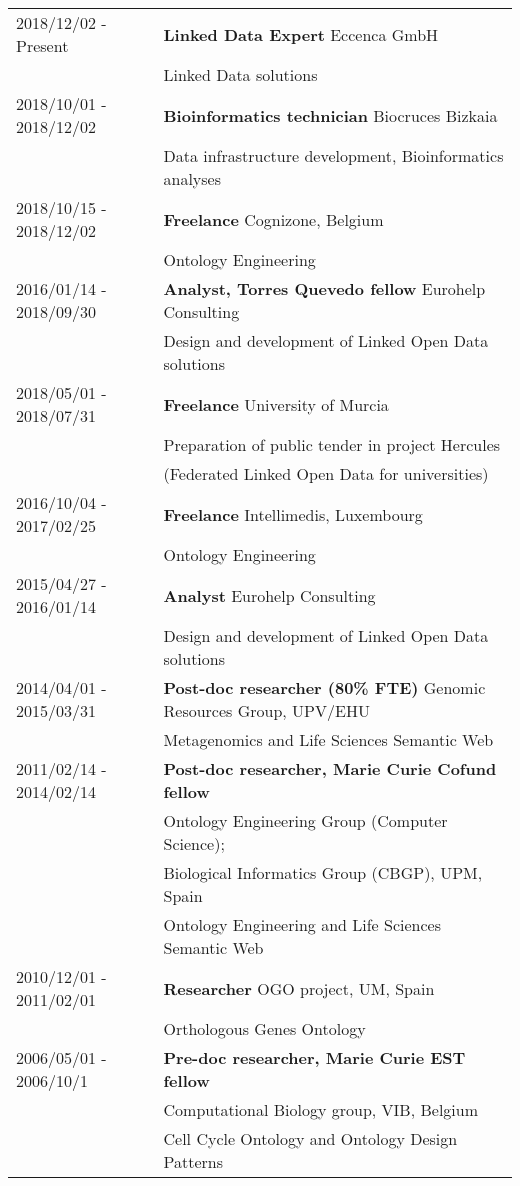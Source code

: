\documentclass[11pt,fullpage]{article}
\begin{document}
\begin{tabular}{ll}
2018/12/02 - Present & {\bf Linked Data Expert} Eccenca GmbH \\
      & Linked Data solutions \\
2018/10/01 - 2018/12/02 & {\bf Bioinformatics technician} Biocruces Bizkaia \\
      & Data infrastructure development, Bioinformatics analyses \\
2018/10/15 - 2018/12/02 & {\bf Freelance} Cognizone, Belgium\\
              &  Ontology Engineering \\
2016/01/14 - 2018/09/30 & {\bf Analyst, Torres Quevedo fellow} Eurohelp Consulting \\
	      & Design and development of Linked Open Data solutions\\
2018/05/01 - 2018/07/31 & {\bf Freelance} University of Murcia \\
        &  Preparation of public tender in project Hercules\\
        & (Federated Linked Open Data for universities) \\
2016/10/04 - 2017/02/25 & {\bf Freelance} Intellimedis, Luxembourg\\
        &  Ontology Engineering \\
 2015/04/27 -  2016/01/14 & {\bf Analyst} Eurohelp Consulting \\
	    & Design and development of Linked Open Data solutions\\
 2014/04/01 - 2015/03/31 & {\bf Post-doc researcher (80\% FTE)} Genomic Resources Group, UPV/EHU  \\
	  & Metagenomics and Life Sciences Semantic Web \\
 2011/02/14 - 2014/02/14 & {\bf Post-doc researcher, Marie Curie Cofund fellow} \\
      & Ontology Engineering Group (Computer Science); \\
      & Biological Informatics Group (CBGP), UPM, Spain \\
	    & Ontology Engineering and Life Sciences Semantic Web \\
 2010/12/01 - 2011/02/01 & {\bf Researcher} OGO project, UM, Spain \\
      & Orthologous Genes Ontology \\
 2006/05/01 - 2006/10/1 & {\bf Pre-doc researcher, Marie Curie EST fellow} \\
     & Computational Biology group, VIB, Belgium \\
     & Cell Cycle Ontology and Ontology Design Patterns \\
\end{tabular}
\end{document}
